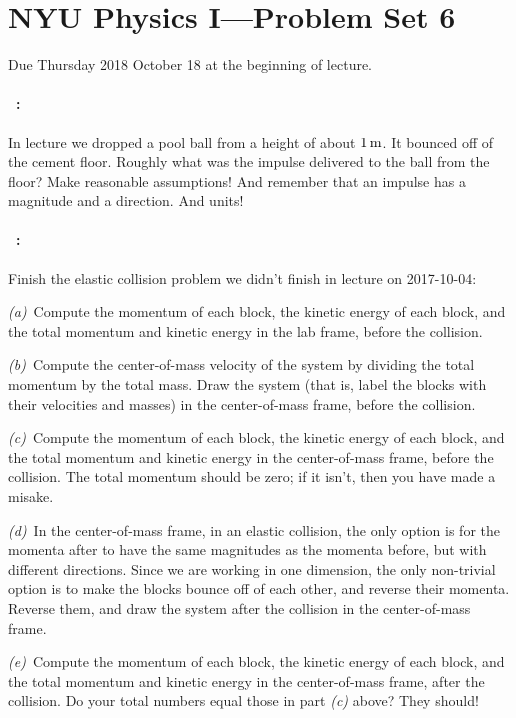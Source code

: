 \documentclass[12pt]{article}
\begin{document}
\section*{NYU Physics I---Problem Set 6}

Due Thursday 2018 October 18 at the beginning of lecture.

\paragraph{\problemname~\theproblem:}%
In lecture we dropped a pool ball from a height of about $1\,\mathrm{m}$. It
bounced off of the cement floor. Roughly what was the impulse
delivered to the ball from the floor? Make reasonable assumptions! And
remember that an impulse has a magnitude and a direction. And units!

\paragraph{\problemname~\theproblem:}\label{elastic}%
Finish the elastic collision problem we didn't finish in lecture on 2017-10-04:

\textsl{(a)}~Compute the momentum of each block, the kinetic energy of
each block, and the total momentum and kinetic energy in the lab
frame, before the collision.

\textsl{(b)}~Compute the center-of-mass velocity of the system by
dividing the total momentum by the total mass. Draw the system (that
is, label the blocks with their velocities and masses) in the
center-of-mass frame, before the collision.

\textsl{(c)}~Compute the momentum of each block, the kinetic energy of
each block, and the total momentum and kinetic energy in the
center-of-mass frame, before the collision. The total momentum should
be zero; if it isn't, then you have made a misake.

\textsl{(d)}~In the center-of-mass frame, in an elastic collision, the
only option is for the momenta after to have the same magnitudes as
the momenta before, but with different directions. Since we are
working in one dimension, the only non-trivial option is to make the
blocks bounce off of each other, and reverse their momenta. Reverse
them, and draw the system after the collision in the center-of-mass
frame.

\textsl{(e)}~Compute the momentum of each block, the kinetic energy of
each block, and the total momentum and kinetic energy in the
center-of-mass frame, after the collision. Do your total numbers equal those
in part \textsl{(c)} above? They should!
\end{document}
